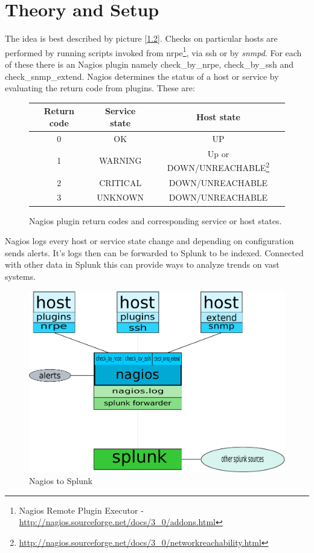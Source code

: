 \documentclass[10pt,a4paper,final]{report}
\begin{document}
\chapter{Theory and Setup}
The idea is best described by picture [\ref{NtS}]. Checks on particular hosts are performed by running scripts invoked from nrpe\footnote{Nagios Remote Plugin Executor - \url{http://nagios.sourceforge.net/docs/3\_0/addons.html}}, via ssh or by \emph{snmpd}. For each of these there is an Nagios plugin namely check\_by\_nrpe, check\_by\_ssh and check\_snmp\_extend. Nagios determines the status of a host or service by evaluating the return code from plugins. These are:
\begin{figure}[hbpt]
\begin{center}
\begin{tabular}{|c|c|c|}
\hline Return code & Service state & Host state \\ 
\hline 0 & OK & UP \\ 
\hline 1 & WARNING & Up or DOWN/UNREACHABLE\footnote{\url{http://nagios.sourceforge.net/docs/3\_0/networkreachability.html}} \\ 
\hline 2 & CRITICAL & DOWN/UNREACHABLE \\ 
\hline 3 & UNKNOWN & DOWN/UNREACHABLE \\ 
\hline 
\end{tabular}
\end{center}
\caption{Nagios plugin return codes and corresponding service or host states.}
\label{ReturnC}
\end{figure}

Nagios logs every host or service state change and depending on configuration sends alerts. It's logs then can be forwarded to Splunk to be indexed. Connected with other data in Splunk this can provide ways to analyze trends on vast systems. 

\begin{figure}[hbpt]
\begin{center}
\includegraphics[scale=0.5]{nts.pdf}
\end{center}
\caption{Nagios to Splunk}
\label{NtS}
\end{figure}
\end{document}
